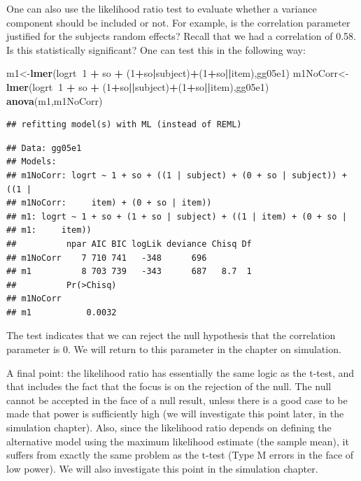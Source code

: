 \documentclass[12pt,]{krantz}
\newenvironment{Shaded}{\begin{snugshade}}{\end{snugshade}}
\newcommand{\DecValTok}[1]{\textcolor[rgb]{0.00,0.00,0.81}{#1}}
\newcommand{\KeywordTok}[1]{\textcolor[rgb]{0.13,0.29,0.53}{\textbf{#1}}}
\newcommand{\NormalTok}[1]{#1}
\newcommand{\OperatorTok}[1]{\textcolor[rgb]{0.81,0.36,0.00}{\textbf{#1}}}
\newcommand{\StringTok}[1]{\textcolor[rgb]{0.31,0.60,0.02}{#1}}
\begin{document}
One can also use the likelihood ratio test to evaluate whether a variance component should be included or not. For example, is the correlation parameter justified for the subjects random effects? Recall that we had a correlation of 0.58. Is this statistically significant? One can test this in the following way:

\begin{Shaded}
\begin{Highlighting}[]
\NormalTok{m1<-}\KeywordTok{lmer}\NormalTok{(logrt}\OperatorTok{~}\DecValTok{1} \OperatorTok{+}\StringTok{ }\NormalTok{so }\OperatorTok{+}\StringTok{ }\NormalTok{(}\DecValTok{1}\OperatorTok{+}\NormalTok{so}\OperatorTok{|}\NormalTok{subject)}\OperatorTok{+}\NormalTok{(}\DecValTok{1}\OperatorTok{+}\NormalTok{so}\OperatorTok{||}\NormalTok{item),gg05e1)}
\NormalTok{m1NoCorr<-}\KeywordTok{lmer}\NormalTok{(logrt}\OperatorTok{~}\DecValTok{1} \OperatorTok{+}\StringTok{ }\NormalTok{so }\OperatorTok{+}\StringTok{ }\NormalTok{(}\DecValTok{1}\OperatorTok{+}\NormalTok{so}\OperatorTok{||}\NormalTok{subject)}\OperatorTok{+}\NormalTok{(}\DecValTok{1}\OperatorTok{+}\NormalTok{so}\OperatorTok{||}\NormalTok{item),gg05e1)}
\KeywordTok{anova}\NormalTok{(m1,m1NoCorr)}
\end{Highlighting}
\end{Shaded}

\begin{verbatim}
## refitting model(s) with ML (instead of REML)
\end{verbatim}

\begin{verbatim}
## Data: gg05e1
## Models:
## m1NoCorr: logrt ~ 1 + so + ((1 | subject) + (0 + so | subject)) + ((1 | 
## m1NoCorr:     item) + (0 + so | item))
## m1: logrt ~ 1 + so + (1 + so | subject) + ((1 | item) + (0 + so | 
## m1:     item))
##          npar AIC BIC logLik deviance Chisq Df
## m1NoCorr    7 710 741   -348      696         
## m1          8 703 739   -343      687   8.7  1
##          Pr(>Chisq)
## m1NoCorr           
## m1           0.0032
\end{verbatim}

The test indicates that we can reject the null hypothesis that the correlation parameter is 0. We will return to this parameter in the chapter on simulation.

A final point: the likelihood ratio has essentially the same logic as the t-test, and that includes the fact that the focus is on the rejection of the null. The null cannot be accepted in the face of a null result, unless there is a good case to be made that power is sufficiently high (we will investigate this point later, in the simulation chapter). Also, since the likelihood ratio depends on defining the alternative model using the maximum likelihood estimate (the sample mean), it suffers from exactly the same problem as the t-test (Type M errors in the face of low power). We will also investigate this point in the simulation chapter.
\end{document}
